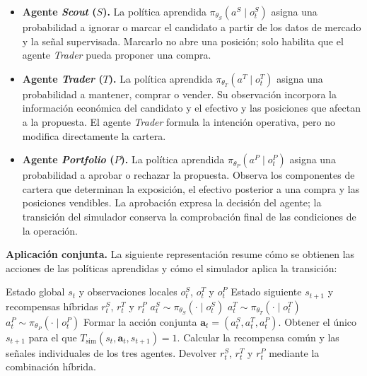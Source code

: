 \begin{itemize}
    \setlength{\itemsep}{0.35em}
    \setlength{\topsep}{0.35em}
    \item \textbf{Agente \textit{Scout} ($S$).} La política aprendida $\pi_{\theta_S}(a^S\mid o_t^S)$ asigna una probabilidad a ignorar o marcar el candidato a partir de los datos de mercado y la señal supervisada. Marcarlo no abre una posición; solo habilita que el agente \textit{Trader} pueda proponer una compra.
    \item \textbf{Agente \textit{Trader} ($T$).} La política aprendida $\pi_{\theta_T}(a^T\mid o_t^T)$ asigna una probabilidad a mantener, comprar o vender. Su observación incorpora la información económica del candidato y el efectivo y las posiciones que afectan a la propuesta. El agente \textit{Trader} formula la intención operativa, pero no modifica directamente la cartera.
    \item \textbf{Agente \textit{Portfolio} ($P$).} La política aprendida $\pi_{\theta_P}(a^P\mid o_t^P)$ asigna una probabilidad a aprobar o rechazar la propuesta. Observa los componentes de cartera que determinan la exposición, el efectivo posterior a una compra y las posiciones vendibles. La aprobación expresa la decisión del agente; la transición del simulador conserva la comprobación final de las condiciones de la operación.
\end{itemize}

\textbf{Aplicación conjunta.} La siguiente representación resume cómo se obtienen las acciones de las políticas aprendidas y cómo el simulador aplica la transición:

\begin{algorithm}[H]
\small
\caption{Aplicación de la acción conjunta}
\label{alg:decision-cooperativa}
\begin{algorithmic}[1]
\Require Estado global $s_t$ y observaciones locales $o_t^S$, $o_t^T$ y $o_t^P$
\Ensure Estado siguiente $s_{t+1}$ y recompensas híbridas $r_t^S$, $r_t^T$ y $r_t^P$
\State $a_t^{S} \sim \pi_{\theta_S}(\cdot\mid o_t^{S})$
\State $a_t^{T} \sim \pi_{\theta_T}(\cdot\mid o_t^{T})$
\State $a_t^{P} \sim \pi_{\theta_P}(\cdot\mid o_t^{P})$
\State Formar la acción conjunta $\mathbf{a}_t=(a_t^S,a_t^T,a_t^P)$.
\State Obtener el único $s_{t+1}$ para el que $T_{\mathrm{sim}}(s_t,\mathbf{a}_t,s_{t+1})=1$.
\State Calcular la recompensa común y las señales individuales de los tres agentes.
\State Devolver $r_t^S$, $r_t^T$ y $r_t^P$ mediante la combinación híbrida.
\end{algorithmic}
\end{algorithm}

